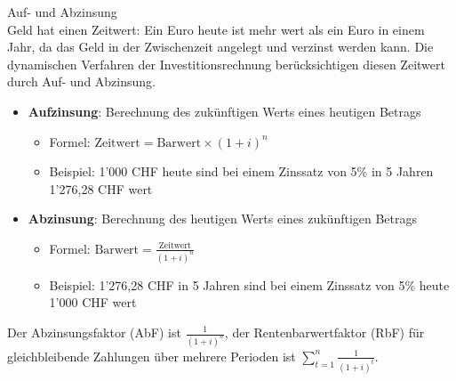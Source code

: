 \begin{concept}{Auf- und Abzinsung}\\
Geld hat einen Zeitwert: Ein Euro heute ist mehr wert als ein Euro in einem Jahr, da das Geld in der Zwischenzeit angelegt und verzinst werden kann. Die dynamischen Verfahren der Investitionsrechnung berücksichtigen diesen Zeitwert durch Auf- und Abzinsung.
\begin{itemize}
    \item \textbf{Aufzinsung}: Berechnung des zukünftigen Werts eines heutigen Betrags
    \begin{itemize}
        \item Formel: $\text{Zeitwert} = \text{Barwert} \times (1 + i)^n$
        \item Beispiel: 1'000 CHF heute sind bei einem Zinssatz von 5\% in 5 Jahren 1'276,28 CHF wert
    \end{itemize}
    \item \textbf{Abzinsung}: Berechnung des heutigen Werts eines zukünftigen Betrags
    \begin{itemize}
        \item Formel: $\text{Barwert} = \frac{\text{Zeitwert}}{(1 + i)^n}$
        \item Beispiel: 1'276,28 CHF in 5 Jahren sind bei einem Zinssatz von 5\% heute 1'000 CHF wert
    \end{itemize}
\end{itemize}

Der Abzinsungsfaktor (AbF) ist $\frac{1}{(1 + i)^n}$, der Rentenbarwertfaktor (RbF) für gleichbleibende Zahlungen über mehrere Perioden ist $\sum_{t=1}^{n} \frac{1}{(1 + i)^t}$.
\end{concept}

